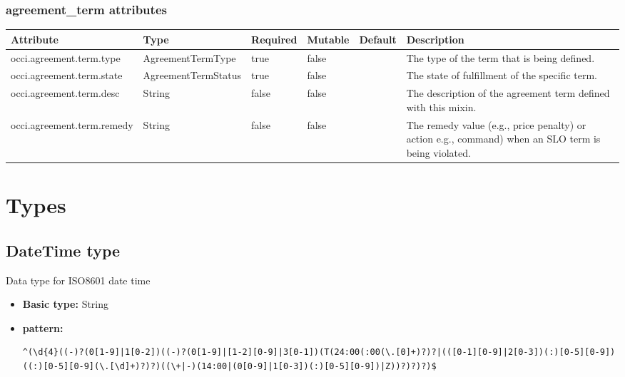 \documentclass{article}
\begin{document}
\subsubsection{agreement\_term attributes}
\begin{tabularx}{\textwidth}{|l|l|p{1.4cm}|p{1.3cm}|l|X|}
  \hline
  \textbf{Attribute} & \textbf{Type} & \textbf{Required} & \textbf{Mutable} & \textbf{Default} & \textbf{Description} \\
  \hline  
  occi.agreement.term.type & AgreementTermType & true & false &  & The type of the term that is being defined. \\
  \hline
  occi.agreement.term.state & AgreementTermStatus & true & false &  & The state of fulfillment of the specific term. \\
  \hline
  occi.agreement.term.desc & String & false & false &  & The description of the agreement term defined with this mixin. \\
  \hline
  occi.agreement.term.remedy & String & false & false &  & The remedy value (e.g., price penalty) or action e.g., command) when an SLO term is being violated. \\
  \hline
\end{tabularx}


\section{Types}
\subsection{DateTime type}
Data type for ISO8601 date time
\begin{itemize}
\item \textbf{Basic type:} String
	\item \textbf{pattern:} \begin{verbatim}^(\d{4}((-)?(0[1-9]|1[0-2])((-)?(0[1-9]|[1-2][0-9]|3[0-1])(T(24:00(:00(\.[0]+)?)?|(([0-1][0-9]|2[0-3])(:)[0-5][0-9])((:)[0-5][0-9](\.[\d]+)?)?)((\+|-)(14:00|(0[0-9]|1[0-3])(:)[0-5][0-9])|Z))?)?)?)$\end{verbatim}
\end{itemize}
\end{document}
